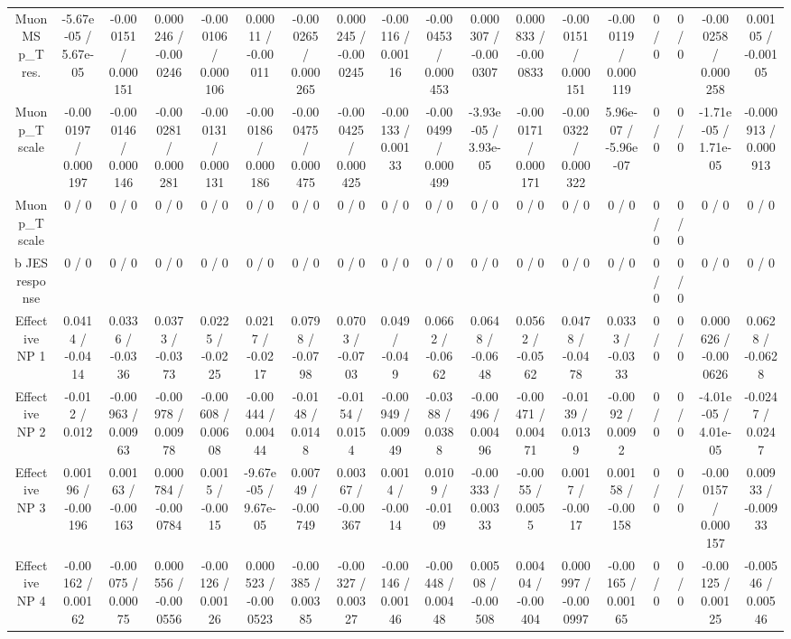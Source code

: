 \documentclass[10pt]{article}
\begin{document}
\begin{table}[htbp]
\begin{center}
\begin{tabular}{|c|c|c|c|c|c|c|c|c|c|c|c|c|c|c|c|c|c|}
  Muon MS p_{T} res. & -5.67e-05 / 5.67e-05 & -0.000151 / 0.000151 & 0.000246 / -0.000246 & -0.000106 / 0.000106 & 0.00011 / -0.00011 & -0.000265 / 0.000265 & 0.000245 / -0.000245 & -0.00116 / 0.00116 & -0.000453 / 0.000453 & 0.000307 / -0.000307 & 0.000833 / -0.000833 & -0.000151 / 0.000151 & -0.000119 / 0.000119 & 0 / 0 & 0 / 0 & -0.000258 / 0.000258 & 0.00105 / -0.00105 \\ 
  Muon p_{T} scale & -0.000197 / 0.000197 & -0.000146 / 0.000146 & -0.000281 / 0.000281 & -0.000131 / 0.000131 & -0.000186 / 0.000186 & -0.000475 / 0.000475 & -0.000425 / 0.000425 & -0.00133 / 0.00133 & -0.000499 / 0.000499 & -3.93e-05 / 3.93e-05 & -0.000171 / 0.000171 & -0.000322 / 0.000322 & 5.96e-07 / -5.96e-07 & 0 / 0 & 0 / 0 & -1.71e-05 / 1.71e-05 & -0.000913 / 0.000913 \\ 
  Muon p_{T} scale & 0 / 0 & 0 / 0 & 0 / 0 & 0 / 0 & 0 / 0 & 0 / 0 & 0 / 0 & 0 / 0 & 0 / 0 & 0 / 0 & 0 / 0 & 0 / 0 & 0 / 0 & 0 / 0 & 0 / 0 & 0 / 0 & 0 / 0 \\ 
  b JES response & 0 / 0 & 0 / 0 & 0 / 0 & 0 / 0 & 0 / 0 & 0 / 0 & 0 / 0 & 0 / 0 & 0 / 0 & 0 / 0 & 0 / 0 & 0 / 0 & 0 / 0 & 0 / 0 & 0 / 0 & 0 / 0 & 0 / 0 \\ 
  Effective NP 1 & 0.0414 / -0.0414 & 0.0336 / -0.0336 & 0.0373 / -0.0373 & 0.0225 / -0.0225 & 0.0217 / -0.0217 & 0.0798 / -0.0798 & 0.0703 / -0.0703 & 0.049 / -0.049 & 0.0662 / -0.0662 & 0.0648 / -0.0648 & 0.0562 / -0.0562 & 0.0478 / -0.0478 & 0.0333 / -0.0333 & 0 / 0 & 0 / 0 & 0.000626 / -0.000626 & 0.0628 / -0.0628 \\ 
  Effective NP 2 & -0.012 / 0.012 & -0.00963 / 0.00963 & -0.00978 / 0.00978 & -0.00608 / 0.00608 & -0.00444 / 0.00444 & -0.0148 / 0.0148 & -0.0154 / 0.0154 & -0.00949 / 0.00949 & -0.0388 / 0.0388 & -0.00496 / 0.00496 & -0.00471 / 0.00471 & -0.0139 / 0.0139 & -0.0092 / 0.0092 & 0 / 0 & 0 / 0 & -4.01e-05 / 4.01e-05 & -0.0247 / 0.0247 \\ 
  Effective NP 3 & 0.00196 / -0.00196 & 0.00163 / -0.00163 & 0.000784 / -0.000784 & 0.0015 / -0.0015 & -9.67e-05 / 9.67e-05 & 0.00749 / -0.00749 & 0.00367 / -0.00367 & 0.0014 / -0.0014 & 0.0109 / -0.0109 & -0.00333 / 0.00333 & -0.0055 / 0.0055 & 0.0017 / -0.0017 & 0.00158 / -0.00158 & 0 / 0 & 0 / 0 & -0.000157 / 0.000157 & 0.00933 / -0.00933 \\ 
  Effective NP 4 & -0.00162 / 0.00162 & -0.00075 / 0.00075 & 0.000556 / -0.000556 & -0.00126 / 0.00126 & 0.000523 / -0.000523 & -0.00385 / 0.00385 & -0.00327 / 0.00327 & -0.00146 / 0.00146 & -0.00448 / 0.00448 & 0.00508 / -0.00508 & 0.00404 / -0.00404 & 0.000997 / -0.000997 & -0.00165 / 0.00165 & 0 / 0 & 0 / 0 & -0.00125 / 0.00125 & -0.00546 / 0.00546 \\ 

\end{tabular}
\end{center}
\end{table}
\end{document}
